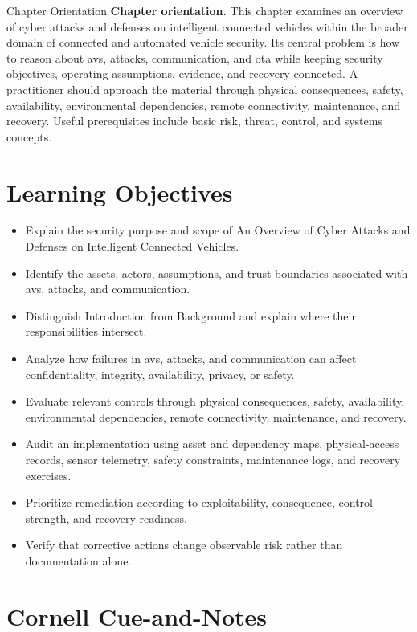 \documentclass[11pt,letterpaper]{article}
\title{\CornellDocumentTitle}
\author{}
\date{}
\begin{document}
\maketitle
\begin{CornellOverviewBox}{Chapter Orientation}
\textbf{Chapter orientation.} This chapter examines an overview of cyber attacks and defenses on intelligent connected vehicles within the broader domain of connected and automated vehicle security. Its central problem is how to reason about avs, attacks, communication, and ota while keeping security objectives, operating assumptions, evidence, and recovery connected. A practitioner should approach the material through physical consequences, safety, availability, environmental dependencies, remote connectivity, maintenance, and recovery. Useful prerequisites include basic risk, threat, control, and systems concepts.
\end{CornellOverviewBox}
\section*{Learning Objectives}
\begin{itemize}
\item Explain the security purpose and scope of An Overview of Cyber Attacks and Defenses on Intelligent Connected Vehicles.
\item Identify the assets, actors, assumptions, and trust boundaries associated with avs, attacks, and communication.
\item Distinguish Introduction from Background and explain where their responsibilities intersect.
\item Analyze how failures in avs, attacks, and communication can affect confidentiality, integrity, availability, privacy, or safety.
\item Evaluate relevant controls through physical consequences, safety, availability, environmental dependencies, remote connectivity, maintenance, and recovery.
\item Audit an implementation using asset and dependency maps, physical-access records, sensor telemetry, safety constraints, maintenance logs, and recovery exercises.
\item Prioritize remediation according to exploitability, consequence, control strength, and recovery readiness.
\item Verify that corrective actions change observable risk rather than documentation alone.
\end{itemize}
\section*{Cornell Cue-and-Notes}
\end{document}
